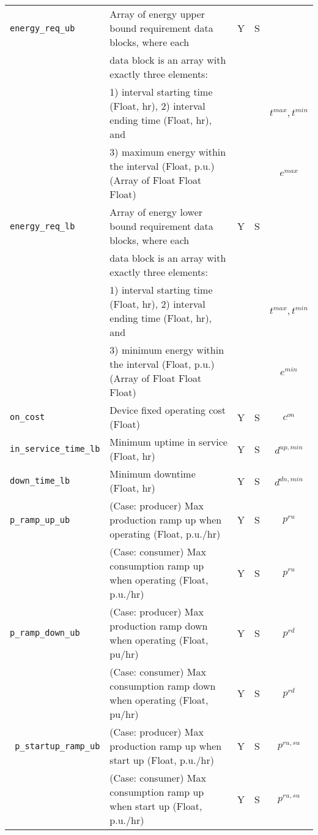 \documentclass{article}
\begin{document}
\begin{center}
\begin{tabular}{ l | l | c | c | c |}
  {\tt energy\_req\_ub} & Array of energy upper bound requirement data blocks, where each & Y & S & \\
                        & data block is an array with exactly three elements: &   &   & \\
                        & 1) interval starting time (Float, hr), 2) interval ending time (Float, hr), and &   &   & { $t^{max}, t^{min}$}\\
                        & 3) maximum energy within the interval (Float, p.u.) (Array of Float Float Float) &   &   & { $e^{max}$ }\\
  {\tt energy\_req\_lb} & Array of energy lower bound requirement data blocks, where each & Y & S &  \\
                        & data block is an array with exactly three elements: &   &   & \\
                        & 1) interval starting time (Float, hr), 2) interval ending time (Float, hr), and &   &   & { $t^{max}, t^{min}$}\\
                        & 3) minimum energy within the interval (Float, p.u.) (Array of Float Float Float) &   &   & { $e^{min}$}\\                               
  {\tt on\_cost} & Device fixed operating cost (Float) & Y & S & $c^{on}$\\
  {\tt in\_service\_time\_lb} & Minimum uptime in service (Float, hr) & Y & S & $d^{up,min}$\\
  {\tt down\_time\_lb} & Minimum downtime (Float, hr) & Y & S & $d^{dn,min}$\\
  {\tt p\_ramp\_up\_ub}     & {(Case: producer) Max production ramp up when operating (Float, p.u./hr)} & Y & S & $p^{ru}$ \\
                            & {(Case: consumer) Max consumption ramp up when operating (Float, p.u./hr)} & Y & S & $p^{ru}$ \\
  {\tt p\_ramp\_down\_ub}   & {(Case: producer) Max production ramp down when operating (Float, pu/hr)} & Y & S & $p^{rd}$ \\
                            & {(Case: consumer) Max consumption ramp down when operating (Float, pu/hr)} & Y & S & $p^{rd}$ \\
  {\tt\color{red} p\_startup\_ramp\_ub} & {(Case: producer) Max production ramp up when start up (Float, p.u./hr)} & Y & S & $p^{ru,su}$\\
                             & {(Case: consumer) Max consumption ramp up when start up (Float, p.u./hr)} & Y & S & $p^{ru,su}$\\

\end{tabular}
\end{center}
\end{document}

